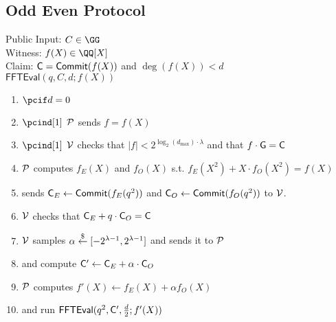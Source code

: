 \documentclass[12pt]{article}
\theoremstyle{Definition}
\begin{document}
\subsection{Odd Even Protocol}
\begin{mdframed}
Public Input: $C\in \GG$\\
Witness: $f(X) \in \QQ[X]$ \\
Claim: $\mathsf{C} =\textsf{{Commit}}(f(X))$ and $\deg(f(X))<d$	\\
$\textsf{FFTEval}(q,C,d;f(X))$
\begin{enumerate}[nolistsep]
		\item $\pcif d=0$
		\item $\pcind[1]$ $\mathcal{P}$ sends $f=f(X)$
		\item $\pcind[1]$ $\mathcal{V}$ checks that $|f|<2^{\log_2(d_{\max}) \cdot \lambda}$ and that $f \cdot \mathsf{G}=\mathsf{C}$
		\item $\mathcal{P}$ computes $f_E(X)$ and $f_O(X)$ s.t. $f_E(X^2)+X \cdot f_O(X^2)=f(X)$ 
		\item \prover sends $\mathsf{C}_E\gets \textsf{{Commit}}(f_E(q^2))$ and $\mathsf{C}_O\gets \textsf{{Commit}}(f_O(q^2))$ to $\mathcal{V}$. 
		\item $\mathcal{V}$ checks that $\mathsf{C}_E+ q\cdot \mathsf{C}_O=\mathsf{C}$ 
		\item $\mathcal{V}$ samples $\alpha \overset{\$}{\gets} [-2^{\lambda-1},2^{\lambda-1}]$ and sends it to $\mathcal{P}$
		\item \prover and \verifier compute $\mathsf{C}'\gets \mathsf{C}_E+\alpha \cdot \mathsf{C}_O$
		\item $\mathcal{P}$ computes $f'(X)\gets f_E(X)+\alpha f_O(X)$
		\item \prover and \verifier run $\textsf{FFTEval}(q^2,\mathsf{C}',\frac{d}{2};f'(X))$
	\end{enumerate}
\end{mdframed}
\end{document}
